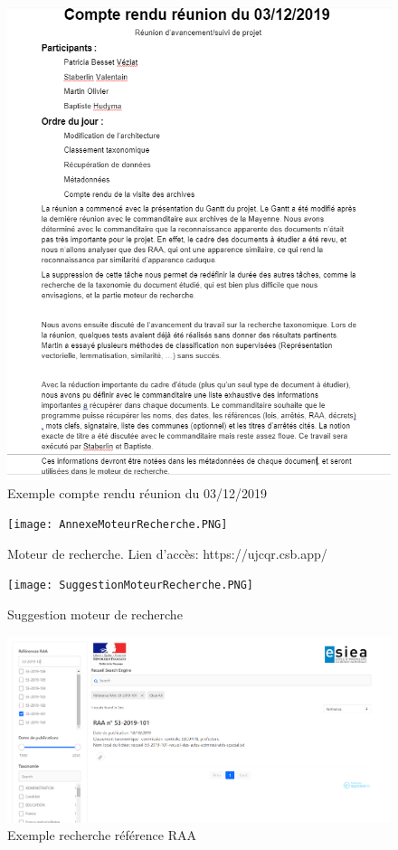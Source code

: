 \begin{figure}[h!]
  \includegraphics[width=\linewidth]{images/ExempleCR.PNG}
	\caption{Exemple compte rendu réunion du 03/12/2019}
	\label{}
\end{figure}

\begin{figure}[h!]
  \texttt{[image: AnnexeMoteurRecherche.PNG]}
	\caption{Moteur de recherche. Lien d'accès: https://ujcqr.csb.app/}
	\label{}
\end{figure}

\begin{figure}[h!]
  \texttt{[image: SuggestionMoteurRecherche.PNG]}
	\caption{Suggestion moteur de recherche}
	\label{}
\end{figure}

\begin{figure}[h!]
  \includegraphics[width=\linewidth]{images/rechercheReferenceMoteurRecherche.PNG}
	\caption{Exemple recherche référence RAA}
	\label{}
\end{figure}

